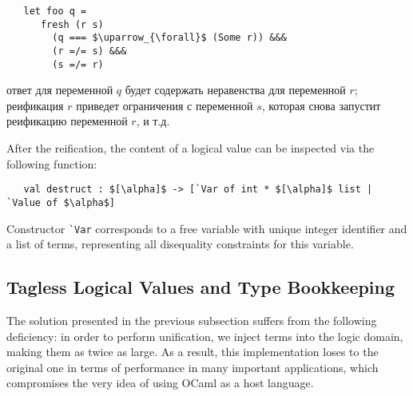 
\begin{lstlisting}
   let foo q =
      fresh (r s)
        (q === $\uparrow_{\forall}$ (Some r)) &&&
        (r =/= s) &&&
        (s =/= r)
\end{lstlisting}

\noindent ответ для переменной  $q$ будет содержать неравенства для переменной $r$; реификация $r$ приведет ограничения с переменной $s$, которая снова запустит реификацию переменной $r$, и т.д.


After the reification, the content of a logical value can be inspected via the following function:

\begin{lstlisting}
   val destruct : $[\alpha]$ -> [`Var of int * $[\alpha]$ list | `Value of $\alpha$]
\end{lstlisting}

Constructor \lstinline|`Var| corresponds to a free variable with unique integer identifier and a list of terms,
representing all disequality constraints for this variable.

\subsection{Tagless Logical Values and Type Bookkeeping}

The solution presented in the previous subsection suffers from the following deficiency: in order to perform unification,
we inject terms into the logic domain, making them as twice as large. As a result, this implementation loses to the original one in
terms of performance in many important applications, which compromises the very idea of using OCaml as a host language.

